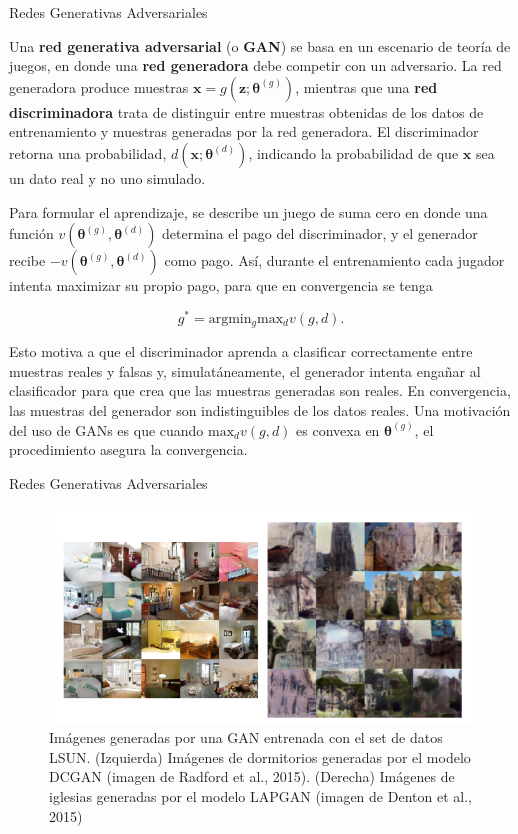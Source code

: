 \documentclass[handout, 9pt]{beamer}
\begin{document}
\begin{frame}{Redes Generativas Adversariales}

Una \textbf{red generativa adversarial} (o \textbf{GAN}) se basa en un escenario de teoría de juegos, en donde una \textbf{red generadora} debe competir con un adversario. La red generadora produce muestras $\bm{x} = g(\bm{z};\bm{\theta}^{(g)})$, mientras que una \textbf{red discriminadora} trata de distinguir entre muestras obtenidas de los datos de entrenamiento y muestras generadas por la red generadora. El discriminador retorna una probabilidad, $d(\bm{x};\bm{\theta}^{(d)})$, indicando la probabilidad de que $\bm{x}$ sea un dato real y no uno simulado. \pause
 
Para formular el aprendizaje, se describe un juego de suma cero en donde una función $v(\bm{\theta}^{(g)},\bm{\theta}^{(d)})$ determina el pago del discriminador, y el generador recibe $-v(\bm{\theta}^{(g)},\bm{\theta}^{(d)})$ como pago. Así, durante el entrenamiento cada jugador intenta maximizar su propio pago, para que en convergencia se tenga \pause

\begin{equation*}
g^{*} = \textrm{arg} \textrm{min}_{g} \textrm{max}_{d} v(g,d).
\end{equation*} \pause

Esto motiva a que el discriminador aprenda a clasificar correctamente entre muestras reales y falsas y, simulatáneamente, el generador intenta engañar al clasificador para que crea que las muestras generadas son reales. En convergencia, las muestras del generador son indistinguibles de los datos reales. Una motivación del uso de GANs es que cuando $\textrm{max}_{d} v(g,d)$ es convexa en $\bm{\theta}^{(g)}$, el procedimiento asegura la convergencia.


\end{frame}

\begin{frame}{Redes Generativas Adversariales}
\begin{figure}[H]
\captionsetup{font=small,labelfont=small}
\centering
\includegraphics[scale=.7]{../../img/cap7_gans.PNG}
\caption{Imágenes generadas por una GAN entrenada con el set de datos LSUN. (Izquierda) Imágenes de dormitorios generadas por el modelo DCGAN (imagen de Radford et al., 2015). (Derecha) Imágenes de iglesias generadas por el modelo LAPGAN (imagen de Denton et al., 2015)}
\end{figure}

\end{frame}
\end{document}
